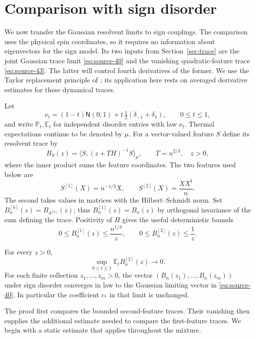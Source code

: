 \section{Comparison with sign disorder}\label{sec:comparison}

We now transfer the Gaussian resolvent limits to sign couplings.  The
comparison uses the physical spin coordinates, so it requires no information
about eigenvectors for the sign model.  Its two inputs from
Section~\ref{sec:trace} are the joint Gaussian trace limit
\eqref{eq:source-40} and the vanishing quadratic-feature trace
\eqref{eq:source-43}.  The latter will control fourth derivatives of the former.
We use the Taylor replacement principle of \cite{Chatterjee2006}; its
application here rests on averaged derivative estimates for these dynamical
traces.

Let
\[
 \nu_t=(1-t)\mathsf N(0,1)+t\,\tfrac12(\delta_{-1}+\delta_1),
 \qquad 0\le t\le1,
\]
and write $\mathbb P_t,\mathbb E_t$ for independent disorder entries with
law $\nu_t$.  Thermal expectations continue to be denoted by $\mu$.
For a vector-valued feature $S$ define its resolvent trace by
\[
 B_S(z)=\langle S,(z+TH)^{-1}S\rangle_\mu,
 \qquad T=n^{2/3},\quad z>0,
\]
where the inner product sums the feature coordinates.  The two features used
below are
\[
 S^{[1]}(X)=n^{-1/3}X,\qquad
 S^{[2]}(X)=\frac{XX^{\mathsf t}}n.
\]
The second takes values in matrices with the Hilbert--Schmidt norm.  Set
$B_n^{[k]}(z)=B_{S^{[k]}}(z)$; thus $B_n^{[1]}(z)=B_n(z)$ by orthogonal
invariance of the sum defining the trace.  Positivity of $H$ gives the useful
deterministic bounds
\begin{equation}\label{eq:comparison-trivial-traces}
 0\le B_n^{[1]}(z)\le \frac{n^{1/3}}z,
 \qquad 0\le B_n^{[2]}(z)\le\frac1z.
\end{equation}

\begin{theorem}\label{thm:comparison-universality}
For every $z>0$,
\[
 \sup_{0\le t\le1}\mathbb E_t B_n^{[2]}(z)\longrightarrow0.
\]
For each finite collection $z_1,\ldots,z_m>0$, the vector
$(B_n(z_1),\ldots,B_n(z_m))$ under sign disorder converges in law to the
Gaussian limiting vector in \eqref{eq:source-40}.  In particular the
coefficient $c_*$ in that limit is unchanged.
\end{theorem}

The proof first compares the bounded second-feature traces.  Their vanishing
then supplies the additional estimate needed to compare the first-feature
traces.  We begin with a static estimate that applies throughout the mixture.

